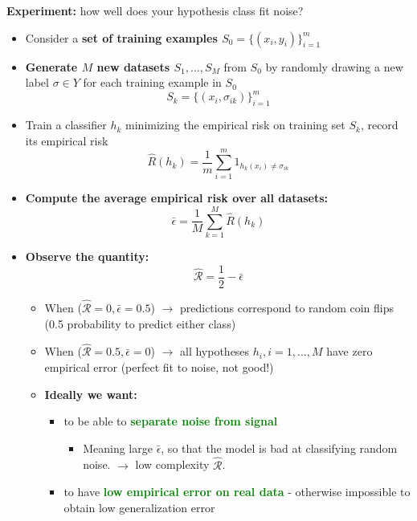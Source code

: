 \documentclass[12pt, a4paper]{article}
\begin{document}
\bigskip \bigskip


\textbf{Experiment:} how well does your hypothesis class fit noise?

\begin{itemize}
  \item Consider a \textbf{set of training examples $S_0 = \{(x_i , y_i)\}^m_{i=1}$}
  \item \textbf{Generate $M$ new datasets $S_1 , ... , S_M$} from $S_0$ by randomly drawing a new label $\sigma \in Y$ for each training example in $S_0$
  $$
  S_k = \{(x_i, \sigma_{ik})\}^m_{i=1}
  $$
  \item Train a classifier $h_k$ minimizing the empirical risk on training set $S_k$, record its empirical risk
  $$
  \hat{R}(h_k) = \frac{1}{m} \sum_{i=1}^{m} 1_{h_k(x_i) \neq \sigma_{ik}}
  $$
  \item \textbf{Compute the average empirical risk over all datasets:}
  $$
  \bar{\epsilon} = \frac{1}{M} \sum_{k=1}^{M} \hat{R}(h_k)
  $$
  \item \textbf{Observe the quantity:}
  $$
  \hat{\mathcal{R}} = \frac{1}{2} - \bar{\epsilon}
  $$
  \begin{itemize}
    \item When ($\hat{\mathcal{R}} = 0, \bar{\epsilon} = 0.5$) $\rightarrow$ predictions correspond to random coin flips (0.5 probability to predict either class)
    \item When ($\hat{\mathcal{R}} = 0.5, \bar{\epsilon} = 0$) $\rightarrow$ all hypotheses $h_i , i = 1, ... , M$ have zero empirical error (perfect fit to noise, not good!)
    \item \textbf{Ideally we want:}
    \begin{itemize}
      \item to be able to \textbf{\textcolor{Green}{separate noise from signal}}
      \begin{itemize}
        \item Meaning large $\bar{\epsilon}$, so that the model is bad at classifying random noise. $\rightarrow$ low complexity $\hat{\mathcal{R}}$.
      \end{itemize}
      \item to have \textbf{\textcolor{Green}{low empirical error on real data}} - otherwise impossible to obtain low generalization error
    \end{itemize}
  \end{itemize}
\end{itemize}
\end{document}
